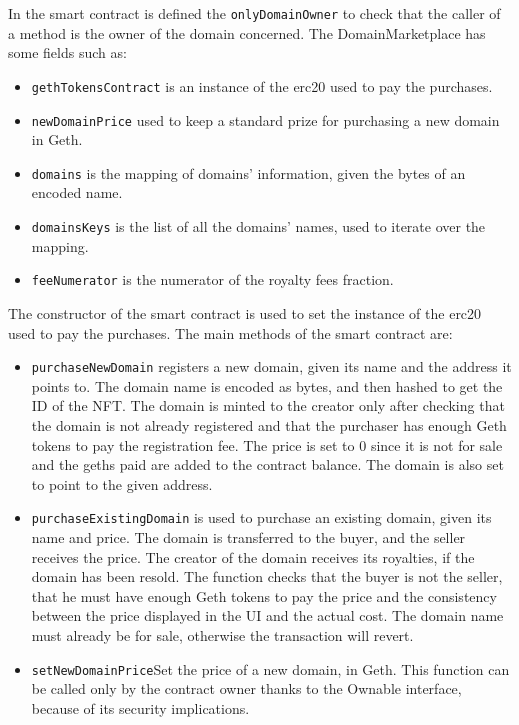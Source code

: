 \documentclass[main.tex]{subfiles}
\begin{document}
In the smart contract is defined the \texttt{onlyDomainOwner} to check that the caller of a method is the owner of the domain concerned.
The DomainMarketplace has some fields such as:
\begin{itemize}
    \item \texttt{gethTokensContract}  is an instance of the erc20 used to pay the purchases.
    \item \texttt{newDomainPrice} used to keep a standard prize for purchasing a new domain in Geth.
    \item \texttt{domains} is the mapping of domains' information, given the bytes of an encoded name.
    \item \texttt{domainsKeys} is the list of all the domains' names, used to iterate over the mapping.
    \item \texttt{feeNumerator} is the numerator of the royalty fees fraction.
\end{itemize}
\newpage
The constructor of the smart contract is used to set the instance of the erc20 used to pay the purchases.
The main methods of the smart contract are:
\begin{itemize}
    \item \texttt{purchaseNewDomain} registers a new domain, given its name and the address it points to. The domain name is encoded as bytes, and then hashed to get the ID of the NFT. The domain is minted to the creator only after checking that the domain is not already registered and that the purchaser has enough Geth tokens to pay the registration fee. The price is set to 0 since it is not for sale and the geths paid are added to the contract balance. The domain is also set to point to the given address.
    \item \texttt{purchaseExistingDomain} is used to purchase an existing domain, given its name and price. The domain is transferred to the buyer, and the seller receives the price. The creator of the domain receives its royalties, if the domain has been resold. The function checks that the buyer is not the seller, that he must have enough Geth tokens to pay the price and the consistency between the price displayed in the UI and the actual cost. The domain name must already be for sale, otherwise the transaction will revert.
    \item \texttt{setNewDomainPrice}Set the price of a new domain, in Geth. This function can be called only by the contract owner thanks to the Ownable interface, because of its security implications.
\end{itemize}
\end{document}
